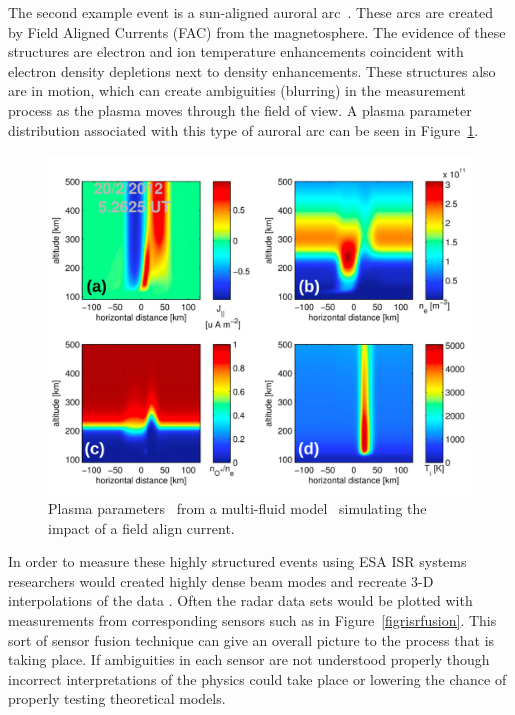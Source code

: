 The second example event is a sun-aligned auroral arc~\cite{Perry:2015jf}. These arcs are created by Field Aligned Currents (FAC) from the magnetosphere. The evidence of these structures are electron and ion temperature enhancements coincident with electron density depletions next to density enhancements. These structures also are in motion, which can create ambiguities (blurring) in the measurement process as the plasma moves through the field of view. A plasma parameter distribution associated with this type of auroral arc can be seen in Figure~\ref{fig:mzsim}.
\begin{figure}[!t]
\centering
\includegraphics[width=5.0in]{MZsim}
\caption{Plasma parameters~\cite{Perry:2015jf} from a multi-fluid model~\cite{semeter:plasmatransport2012} simulating the impact of a field align current. }
\label{fig:mzsim}
\end{figure}


In order to measure these highly structured events using ESA ISR systems researchers would created highly dense beam modes and recreate 3-D interpolations of the data \cite{Dahlgren:2012dq,dahlgren2012di}. Often the radar data sets would be plotted with measurements from corresponding sensors such as in Figure~\ref{figrisrfusion}. This sort of sensor fusion technique can give an overall picture to the process that is taking place. If ambiguities in each sensor are not understood properly though incorrect interpretations of the physics could take place or lowering the chance of properly testing theoretical models. 

